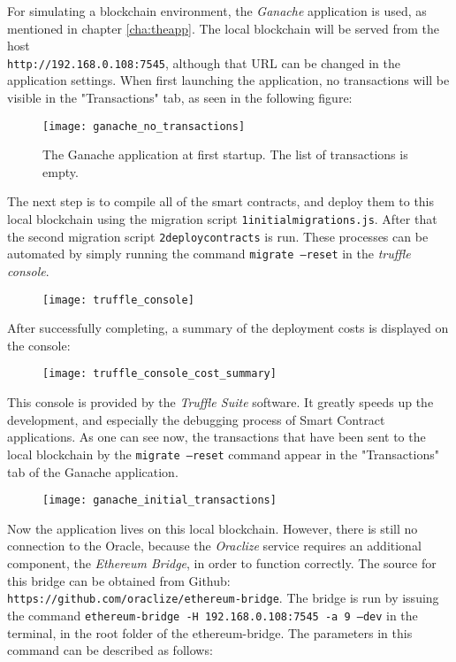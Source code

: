 For simulating a blockchain environment, the \emph{Ganache} application is used, as mentioned in chapter \ref{cha:theapp}. The local blockchain will be served from the host \\
\texttt{http://192.168.0.108:7545}, although that URL can be changed in the application settings. When first launching the application, no transactions will be visible in the "Transactions" tab, as seen in the following figure:
\begin{figure}[H]
\centering
\texttt{[image: ganache\_no\_transactions]}
\caption{The Ganache application at first startup. The list of transactions is empty.}
\end{figure}
The next step is to compile all of the smart contracts, and deploy them to this local blockchain using the migration script \texttt{1\textunderscore initial\textunderscore migrations.js}. After that the second migration script \texttt{2\textunderscore deploy\textunderscore contracts} is run. These processes can be automated by simply running the command \texttt{migrate --reset} in the \emph{truffle console}. 
\begin{figure}[H]
\texttt{[image: truffle\_console]}
\end{figure}
After successfully completing, a summary of the deployment costs is displayed on the console:
\begin{figure}[H]
\texttt{[image: truffle\_console\_cost\_summary]}
\end{figure}
This console is provided by the \emph{Truffle Suite} software. It greatly speeds up the development, and especially the debugging process of Smart Contract applications. As one can see now, the transactions that have been sent to the local blockchain by the \texttt{migrate --reset} command appear in the "Transactions" tab of the Ganache application.
\begin{figure}[H]
\centering
\texttt{[image: ganache\_initial\_transactions]}
\end{figure}
Now the application lives on this local blockchain. However, there is still no connection to the Oracle, because the \emph{Oraclize} service requires an additional component, the \emph{Ethereum Bridge}, in order to function correctly. The source for this bridge can be obtained from Github: \texttt{https://github.com/oraclize/ethereum-bridge}. The bridge is run by issuing the command \texttt{ethereum-bridge -H 192.168.0.108:7545 -a 9 --dev} in the terminal, in the root folder of the ethereum-bridge. The parameters in this command can be described as follows:
